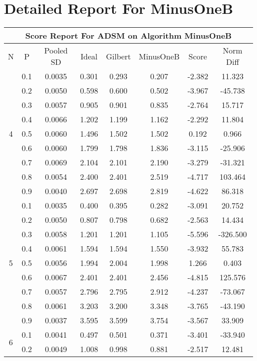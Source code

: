 \documentclass[11pt,a4paper]{report}
\begin{document}
\chapter{Detailed Report For MinusOneB}
\begin{longtable}{ | c | c || c | c | c | c | c | c | }
\hline
\multicolumn{8}{|c|}{ Score Report For ADSM on Algorithm MinusOneB} \\
\hline
N & P & Pooled SD &  Ideal &  Gilbert & MinusOneB  & Score & Norm Diff \\
 \hline
 \hline
 \endhead
\multirow{9}{*}{4} & 0.1 & 0.0035 & 0.301 & 0.293 & 0.207 & -2.382 & 11.323 \\
 & 0.2 & 0.0050 & 0.598 & 0.600 & 0.502 & -3.967 & -45.738 \\
 & 0.3 & 0.0057 & 0.905 & 0.901 & 0.835 & -2.764 & 15.717 \\
 & 0.4 & 0.0066 & 1.202 & 1.199 & 1.162 & -2.292 & 11.804 \\
 & 0.5 & 0.0060 & 1.496 & 1.502 & 1.502 & 0.192 & 0.966 \\
 & 0.6 & 0.0060 & 1.799 & 1.798 & 1.836 & -3.115 & -25.906 \\
 & 0.7 & 0.0069 & 2.104 & 2.101 & 2.190 & -3.279 & -31.321 \\
 & 0.8 & 0.0054 & 2.400 & 2.401 & 2.519 & -4.717 & 103.464 \\
 & 0.9 & 0.0040 & 2.697 & 2.698 & 2.819 & -4.622 & 86.318 \\
 \hline
\multirow{9}{*}{5} & 0.1 & 0.0035 & 0.400 & 0.395 & 0.282 & -3.091 & 20.752 \\
 & 0.2 & 0.0050 & 0.807 & 0.798 & 0.682 & -2.563 & 14.434 \\
 & 0.3 & 0.0058 & 1.201 & 1.201 & 1.105 & -5.596 & -326.500 \\
 & 0.4 & 0.0061 & 1.594 & 1.594 & 1.550 & -3.932 & 55.783 \\
 & 0.5 & 0.0056 & 1.994 & 2.004 & 1.998 & 1.266 & 0.403 \\
 & 0.6 & 0.0067 & 2.401 & 2.401 & 2.456 & -4.815 & 125.576 \\
 & 0.7 & 0.0057 & 2.796 & 2.795 & 2.912 & -4.237 & -73.067 \\
 & 0.8 & 0.0061 & 3.203 & 3.200 & 3.348 & -3.765 & -43.190 \\
 & 0.9 & 0.0037 & 3.595 & 3.599 & 3.754 & -3.567 & 33.909 \\
 \hline
\multirow{9}{*}{6} & 0.1 & 0.0041 & 0.497 & 0.501 & 0.371 & -3.401 & -33.940 \\
 & 0.2 & 0.0049 & 1.008 & 0.998 & 0.881 & -2.517 & 12.481 \\

\end{longtable}
\end{document}
